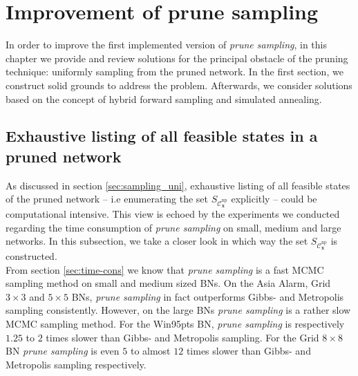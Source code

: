 \documentclass[a4paper, twoside, 11pt]{report}
\newcommand{\bfx}{{\mathbf{x}}}
\newcommand{\C}{{\mathcal C}}
\theoremstyle{plain}
\theoremstyle{definition}
\theoremstyle{remark}
\newcommand{\ps}{\textit{prune sampling }}
\begin{document}
\chapter{Improvement of prune sampling}\label{ch:5}
In order to improve the first implemented version of \textit{prune sampling}, in this chapter we provide and review solutions for the principal obstacle of the {pruning} technique: uniformly sampling from the pruned network. In the first section, we construct solid grounds to address the problem. Afterwards, we consider solutions based on the concept of hybrid forward sampling and simulated annealing.

\section{Exhaustive listing of all feasible states in a pruned network}
As discussed in section \ref{sec:sampling_uni}, exhaustive listing of all feasible states of the pruned network -- i.e enumerating the set $S_{\C_\bfx^{\text{np}}}$ explicitly -- could be computational intensive. This view is echoed by the experiments we conducted regarding the time consumption of \ps on small, medium and large networks. In this subsection, we take a closer look in which way the set $S_{\C_\bfx^{\text{np}}}$ is constructed.\\

From section \ref{sec:time-cons} we know that \ps is a fast MCMC sampling method on small and medium sized BNs. On the Asia Alarm, Grid $3 \times 3$ and $5 \times 5$ BNs, \ps in fact outperforms Gibbs- and Metropolis sampling consistently. However, on the large BNs \ps is a rather slow MCMC sampling method. For the Win95pts BN, \ps is respectively $1.25$ to $2$ times slower than Gibbs- and Metropolis sampling. For the Grid $8 \times 8$ BN \ps is even $5$ to almost $12$ times slower than Gibbs- and Metropolis sampling respectively. \\
\end{document}

